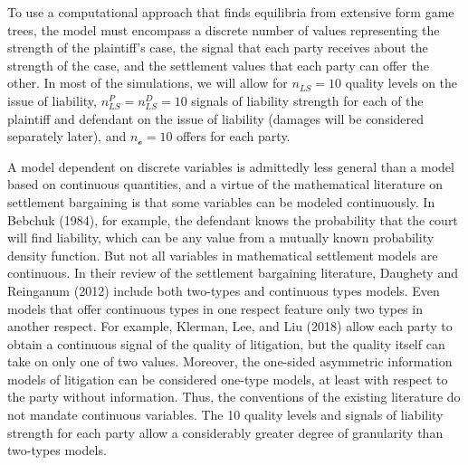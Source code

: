 \documentclass{article}
\begin{document}
To use a computational approach that finds equilibria from extensive form game trees, the model must encompass a discrete number of values representing the strength of the plaintiff's case, the signal that each party receives about the strength of the case, and the settlement values that each party can offer the other. In most of the simulations, we will allow for $n_{LS}=10$ quality levels on the issue of liability, $n_{LS}^P=n_{LS}^D=10$ signals of liability strength for each of the plaintiff and defendant on the issue of liability (damages will be considered separately later), and  $n_{\mathcal{o}}=10$ offers for each party. 

A model dependent on discrete variables is admittedly less general than a model based on continuous quantities, and a virtue of the mathematical literature on settlement bargaining is that some variables can be modeled continuously. In Bebchuk (1984), for example, the defendant knows the probability that the court will find liability, which can be any value from a mutually known probability density function. But not all variables in mathematical settlement models are continuous. In their review of the settlement bargaining literature, Daughety and Reinganum (2012) \cite{daughetyreinganum2012} include both two-types and continuous types models. Even models that offer continuous types in one respect feature only two types in another respect. For example, Klerman, Lee, and Liu (2018) \cite{klermanleeliu} allow each party to obtain a continuous signal of the quality of litigation, but the quality itself can take on only one of two values. Moreover, the one-sided asymmetric information models of litigation can be considered one-type models, at least with respect to the party without information.  Thus, the conventions of the existing literature do not mandate continuous variables. The 10 quality levels and signals of liability strength for each party allow a considerably greater degree of granularity than two-types models. 
\end{document}
